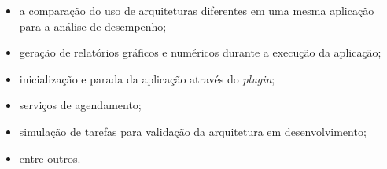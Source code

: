         \begin{itemize}
            \item a comparação do uso de arquiteturas diferentes em uma mesma aplicação para a análise de desempenho;
            
            \item geração de relatórios gráficos e numéricos durante a execução da aplicação;
            
            \item inicialização e parada da aplicação através do \textit{plugin};
            
            \item serviços de agendamento;
            
            \item simulação de tarefas para validação da arquitetura em desenvolvimento;
            
            \item entre outros.
        \end{itemize}
        
        